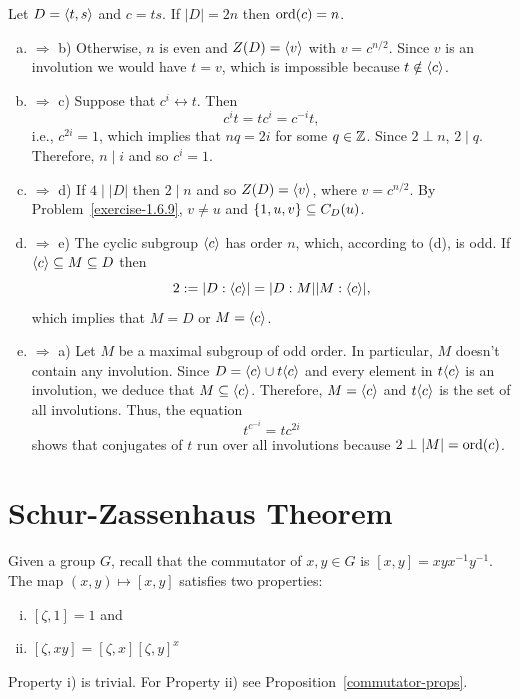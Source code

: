 \begin{solution} Let $D=\langle t,s\rangle$ and $c=ts$. If $|D|=2n$ then ${\rm ord}(c)=n$.

\begin{enumerate}[a),font=\upshape]
    \item $\Rightarrow$ b) Otherwise, $n$ is even and $Z(D)=\langle v\rangle$ with $v=c^{n/2}$. Since $v$ is an involution we would have $t=v$, which is impossible because $t\notin\langle c\rangle$.

    \item $\Rightarrow$ c) Suppose that $c^i\leftrightarrow t$. Then
    $$
        c^it=tc^i=c^{-i}t,
    $$
    i.e., $c^{2i}=1$, which implies that $nq=2i$ for some $q\in\mathbb{Z}$. Since $2\perp n$, $2\mid q$. Therefore, $n\mid i$ and so $c^i=1$.

    \item $\Rightarrow$ d) If $4\mid|D|$ then $2\mid n$ and so $Z(D)=\langle v\rangle$, where $v=c^{n/2}$. By Problem~\ref{exercise-1.6.9}, $v\ne u$ and $\{1,u,v\}\subseteq C_D(u)$.

    \item $\Rightarrow$ e) The cyclic subgroup $\langle c\rangle$ has order $n$, which, according to (d), is odd. If $\langle c\rangle\subseteq M\subseteq D$ then
    $$
        2 := |D:\langle c\rangle| = |D:M||M:\langle c\rangle|,
    $$
    which implies that $M=D$ or $M=\langle c\rangle$.

    \item $\Rightarrow$ a) Let $M$ be a maximal subgroup of odd order. In particular, $M$ doesn't contain any involution. Since $D=\langle c\rangle\cup t\langle c\rangle$ and every element in $t\langle c\rangle$ is an involution, we deduce that $M\subseteq\langle c\rangle$. Therefore, $M=\langle c\rangle$ and $t\langle c\rangle$ is the set of all involutions. Thus, the equation
    $$
        t^{c^{-i}} = tc^{2i}
    $$
    shows that conjugates of $t$ run over all involutions because $2\perp|M|={\rm ord}(c)$.
\end{enumerate}
\end{solution}

\section{Schur-Zassenhaus Theorem}\label{schur-zassenhaus}

Given a group $G$, recall that the commutator of $x,y\in G$ is $[x,y]=xyx^{-1}y^{-1}$. The map $(x,y)\mapsto[x,y]$ satisfies two properties:
\begin{enumerate}[i),font=\upshape]
    \item $[\zeta,1]=1$ and
    \item $[\zeta,xy]=[\zeta,x][\zeta,y]^x$
\end{enumerate}
Property i) is trivial. For Property ii) see Proposition~\ref{commutator-props}.

